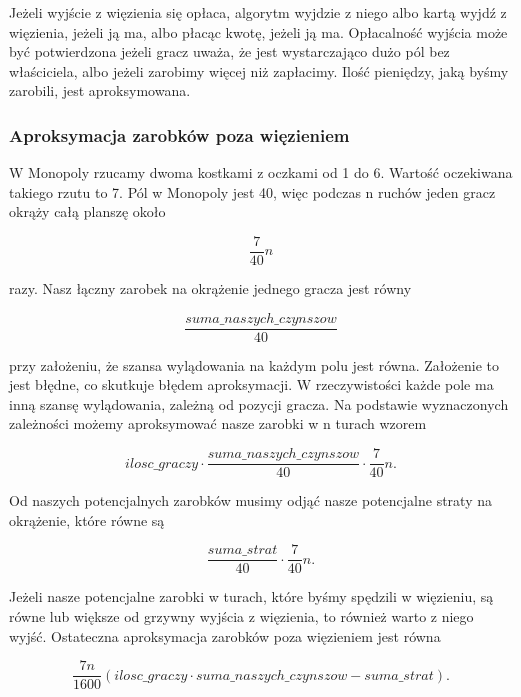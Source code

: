 \documentclass{article}
\begin{document}
Jeżeli wyjście z więzienia się opłaca, algorytm wyjdzie z niego albo kartą wyjdź z więzienia, jeżeli ją ma, albo płacąc kwotę, jeżeli ją ma. Opłacalność wyjścia może być potwierdzona jeżeli gracz uważa, że jest wystarczająco dużo pól bez właściciela, albo jeżeli zarobimy więcej niż zapłacimy. Ilość pieniędzy, jaką byśmy zarobili, jest aproksymowana.

\subsubsection{Aproksymacja zarobków poza więzieniem}

W Monopoly rzucamy dwoma kostkami z oczkami od 1 do 6. Wartość oczekiwana takiego rzutu to 7. Pól w Monopoly jest 40, więc podczas n ruchów jeden gracz okrąży całą planszę około

\begin{equation}
\frac{7}{40}n
\end{equation}

razy. Nasz łączny zarobek na okrążenie jednego gracza jest równy

\begin{equation}
	\frac{suma\_naszych\_czynszow}{40}
\end{equation}

przy założeniu, że szansa wylądowania na każdym polu jest równa. Założenie to jest błędne, co skutkuje błędem aproksymacji. W rzeczywistości każde pole ma inną szansę wylądowania, zależną od pozycji gracza. Na podstawie wyznaczonych zależności możemy aproksymować nasze zarobki w n turach wzorem

\begin{equation}
	ilosc\_graczy \cdot \frac{suma\_naszych\_czynszow}{40} \cdot \frac{7}{40}n.
\end{equation}

Od naszych potencjalnych zarobków musimy odjąć nasze potencjalne straty na okrążenie, które równe są

\begin{equation}
	\frac{suma\_strat}{40} \cdot \frac{7}{40}n.
\end{equation}

Jeżeli nasze potencjalne zarobki w turach, które byśmy spędzili w więzieniu, są równe lub większe od grzywny wyjścia z więzienia, to również warto z niego wyjść. Ostateczna aproksymacja zarobków poza więzieniem jest równa

\begin{equation}
	\frac{7n}{1600}\left(ilosc\_graczy \cdot suma\_naszych\_czynszow - suma\_strat\right).
\end{equation}
\end{document}
